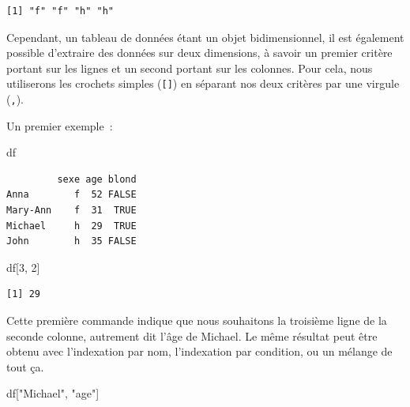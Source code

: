 \documentclass[
  letterpaper,
  DIV=11,
  numbers=noendperiod,
  oneside]{scrreprt}
\newenvironment{Shaded}{\begin{snugshade}}{\end{snugshade}}
\newcommand{\DecValTok}[1]{\textcolor[rgb]{0.68,0.00,0.00}{#1}}
\newcommand{\NormalTok}[1]{\textcolor[rgb]{0.00,0.23,0.31}{#1}}
\newcommand{\SpecialCharTok}[1]{\textcolor[rgb]{0.37,0.37,0.37}{#1}}
\newcommand{\StringTok}[1]{\textcolor[rgb]{0.13,0.47,0.30}{#1}}
\begin{document}
\begin{Shaded}
\end{Shaded}

\begin{verbatim}
[1] "f" "f" "h" "h"
\end{verbatim}

Cependant, un tableau de données étant un objet bidimensionnel, il est
également possible d'extraire des données sur deux dimensions, à savoir
un premier critère portant sur les lignes et un second portant sur les
colonnes. Pour cela, nous utiliserons les crochets simples
(\texttt{{[}{]}}) en séparant nos deux critères par une virgule
(\texttt{,}).

Un premier exemple~:

\begin{Shaded}
\begin{Highlighting}[]
\NormalTok{df}
\end{Highlighting}
\end{Shaded}

\begin{verbatim}
         sexe age blond
Anna        f  52 FALSE
Mary-Ann    f  31  TRUE
Michael     h  29  TRUE
John        h  35 FALSE
\end{verbatim}

\begin{Shaded}
\begin{Highlighting}[]
\NormalTok{df[}\DecValTok{3}\NormalTok{, }\DecValTok{2}\NormalTok{]}
\end{Highlighting}
\end{Shaded}

\begin{verbatim}
[1] 29
\end{verbatim}

Cette première commande indique que nous souhaitons la troisième ligne
de la seconde colonne, autrement dit l'âge de Michael. Le même résultat
peut être obtenu avec l'indexation par nom, l'indexation par condition,
ou un mélange de tout ça.

\begin{Shaded}
\begin{Highlighting}[]
\NormalTok{df[}\StringTok{"Michael"}\NormalTok{, }\StringTok{"age"}\NormalTok{]}
\end{Highlighting}
\end{Shaded}
\end{document}

